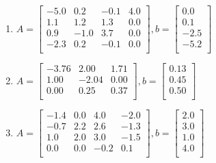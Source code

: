 \documentclass[a4paper]{article}
\begin{document}
\begin{enumerate}
\begin{enumerate}
  \item %
    $A = \begin{bmatrix}
      -5.0 & 0.2 & -0.1 & 4.0\\
      1.1 & 1.2 & 1.3 & 0.0\\
      0.9 & -1.0 & 3.7 & 0.0\\
      -2.3 & 0.2 & -0.1 & 0.0\\
      \end{bmatrix},
      b= \begin{bmatrix}
        0.0\\
        0.1\\
        -2.5\\
        -5.2\\
      \end{bmatrix}$

  \item %
    $A = \begin{bmatrix}
      -3.76 & 2.00 & 1.71\\
      1.00 & -2.04 & 0.00\\
      0.00 & 0.25 & 0.37\\
      \end{bmatrix},
      b= \begin{bmatrix}
        0.13\\
        0.45\\
        0.50\\
      \end{bmatrix}$

  \item %
    $A = \begin{bmatrix}
      -1.4 & 0.0 & 4.0 & -2.0\\
      -0.7 & 2.2 & 2.6 & -1.3\\
      1.0 & 2.0 & 3.0 & -1.5\\
      0.0 & 0.0 & -0.2 & 0.1\\
    \end{bmatrix},
    b= \begin{bmatrix}
      2.0\\
      3.0\\
      1.0\\
      4.0\\
    \end{bmatrix}$


\end{enumerate}
\end{enumerate}
\end{document}

